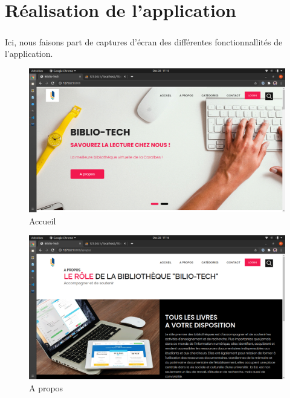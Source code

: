 \chapter{Réalisation de l'application}
\paragraph{}
Ici, nous faisons part de captures d'écran des différentes fonctionnallités de l'application. \par 

\begin{figure}[h]
        \centering
        \includegraphics[width=1\textwidth]{accueil}
        \caption{Accueil}
        \label{image-accueil}
\end{figure}

\begin{figure}[h]
        \centering
        \includegraphics[width=1\textwidth]{a_propos}
        \caption{A propos}
        \label{image-a_propos}
\end{figure}

